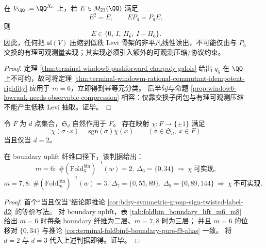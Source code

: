 \begin{corollary}\label{cor:terminal-window6-rational-observable-compression-triviality}
在 \(V_{\QQ}:=\QQ^{X_6}\) 上，若 \(E\in M_{21}(\QQ)\) 满足
\[
E^2=E,\qquad EP_6=P_6E,
\]
则
\[
E\in\{0,\ I,\ \Pi_6,\ I-\Pi_6\}.
\]
因此，任何把 \(\mathfrak{sl}(V)\) 压缩到低秩 Levi 骨架的非平凡线性读出，不可能仅由与 \(P_6\) 交换的有理可观测量实现；其实现必须引入额外的可观测压缩/协议约束。
\end{corollary}
\begin{proof}
定理 \ref{thm:terminal-window6-pushforward-charpoly-galois} 给出 \(q_6\) 在 \(\QQ\) 上不可约，故可将定理 \ref{thm:terminal-windowm-rational-commutant-idempotent-rigidity} 应用于 \(m=6\)，立即得到幂等元分类。
后半句与命题 \ref{prop:window6-lowrank-needs-observable-compression} 相容：仅靠交换子闭包与有理可观测压缩不能产生低秩 Levi 抽取。证毕。
\end{proof}

\begin{proposition}\label{prop:terminal-sign-covariant-label-boundary-bifurcation}
令 \(F\) 为 \(d\) 点集合，\(\mathfrak S_d\) 自然作用于 \(F\)。
存在映射 \(\chi:F\to\{\pm1\}\) 满足
\[
\chi(\sigma\cdot x)=\mathrm{sgn}(\sigma)\chi(x)\qquad(\sigma\in\mathfrak S_d,\ x\in F)
\]
当且仅当 \(d=2\)。

在 boundary uplift 纤维口径下，该判据给出：
\[
m=6:\ \#(\mathrm{Fold}^{\mathrm{bin}}_6)^{-1}(w)=2,\ \Delta_6=\{0,34\}\ \Rightarrow\ \chi\ \text{可实现},
\]
\[
m=7,8:\ \#(\mathrm{Fold}^{\mathrm{bin}}_m)^{-1}(w)=3,\ \Delta_7=\{0,55,89\},\ \Delta_8=\{0,89,144\}\ \Rightarrow\ \chi\ \text{不可实现}.
\]
\end{proposition}
\begin{proof}
首个“当且仅当”结论即推论 \ref{cor:bdry-symmetric-group-sign-twisted-label-d2} 的等价写法。
对 boundary uplift，表 \ref{tab:foldbin_boundary_lift_m6_m8} 给出 \(m=6\) 时每条 boundary 纤维为二层、\(m=7,8\) 时为三层；
并且 \(m=6\) 的位移对 \(\{0,34\}\) 与推论 \ref{cor:terminal-foldbin6-boundary-pure-f9-alias} 一致。
将 \(d=2\) 与 \(d=3\) 代入上述判据即得。证毕。
\end{proof}

